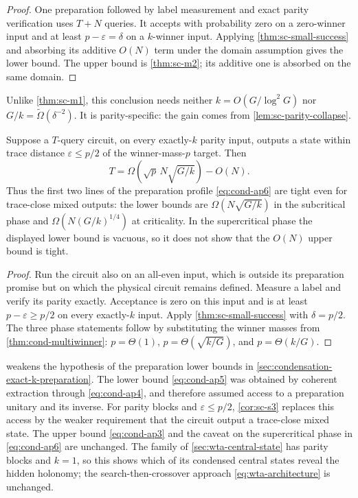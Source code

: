 \begin{proof}
One preparation followed by label measurement and exact parity verification
uses $T+N$ queries.  It accepts with probability zero on a zero-winner input
and at least $p-\varepsilon=\delta$ on a $k$-winner input.  Applying
\cref{thm:sc-small-success} and absorbing its additive $O(N)$ term under the
domain assumption gives the lower bound.  The upper bound is
\cref{thm:sc-m2}; its additive one is absorbed on the same domain.
\end{proof}

Unlike \cref{thm:sc-m1}, this conclusion needs neither
$k=O(G/\log^2G)$ nor $G/k=\widetilde\Omega(\delta^{-2})$.  It is
parity-specific: the gain comes from \cref{lem:sc-parity-collapse}.

\begin{corollary}
\label{cor:sc-s3}
Suppose a $T$-query circuit, on every exactly-$k$ parity input, outputs a
state within trace distance $\varepsilon\le p/2$ of the winner-mass-$p$
target.  Then
\begin{equation}
 T=\Omega\!\left(\sqrt p\,N\sqrt{G/k}\right)-O(N).
 \label{eq:sc-mixed-profile}
\end{equation}
Thus the first two lines of the preparation profile \eqref{eq:cond-ap6}
are tight even for trace-close mixed outputs: the lower bounds are
$\Omega(N\sqrt{G/k})$ in the subcritical phase and
$\Omega(N(G/k)^{1/4})$ at criticality.  In the supercritical phase the
displayed lower bound is vacuous, so it does not show that the $O(N)$ upper
bound is tight.
\end{corollary}

\begin{proof}
Run the circuit also on an all-even input, which is outside its preparation
promise but on which the physical circuit remains defined.  Measure a label
and verify its parity exactly.  Acceptance is zero on this input and is at
least $p-\varepsilon\ge p/2$ on every exactly-$k$ input.  Apply
\cref{thm:sc-small-success} with $\delta=p/2$.  The three phase statements
follow by substituting the winner masses from
\cref{thm:cond-multiwinner}: $p=\Theta(1)$,
$p=\Theta(\sqrt{k/G})$, and $p=\Theta(k/G)$.
\end{proof}

 weakens the hypothesis of the preparation lower bounds in
\cref{sec:condensation-exact-k-preparation}.  The lower bound \eqref{eq:cond-ap5} was obtained by coherent
extraction through \eqref{eq:cond-ap4}, and therefore assumed access to a
preparation unitary and its inverse.  For parity blocks and
$\varepsilon\le p/2$, \cref{cor:sc-s3} replaces this access by the weaker
requirement that the circuit output a trace-close mixed state.  The upper bound \eqref{eq:cond-ap3} and the caveat on the
supercritical phase in \eqref{eq:cond-ap6} are unchanged.  The family
of \cref{sec:wta-central-state} has parity blocks and $k=1$, so this
shows which of its condensed central states reveal the hidden holonomy; the
search-then-crossover approach \eqref{eq:wta-architecture} is unchanged.

